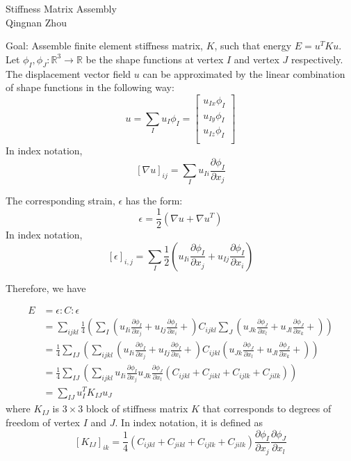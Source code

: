 \documentclass[12pt,letter]{article}
\renewcommand{\Re}{\ensuremath{\mathbb{R}}}
\begin{document}
\begin{center}
Stiffness Matrix Assembly\\
Qingnan Zhou
\end{center}
\vspace{0.2in}
Goal: Assemble finite element stiffness matrix, $K$, such that energy $E = u^T K u$.\\

Let $\phi_I, \phi_J : \Re^3 \rightarrow \Re$ be the shape functions at vertex
$I$ and vertex $J$ respectively.  The displacement vector field $u$ can be
approximated by the linear combination of shape functions in the following way:
$$
u = \sum_{I} u_I \phi_I = \left[
\begin{array}{c}
u_{Ix} \phi_I \\
u_{Iy} \phi_I \\
u_{Iz} \phi_I \\
\end{array}
\right]
$$
In index notation,
$$
[\nabla u]_{ij} = \sum_{I} u_{Ii} \frac{\partial \phi_I}{\partial x_j}
$$

The corresponding strain, $\epsilon$ has the form:
$$
\epsilon = \frac{1}{2} (\nabla u + \nabla u^T)
$$
In index notation,
$$
[\epsilon]_{i,j} = \sum_{I} \frac{1}{2} \left(u_{Ii} \frac{\partial \phi_I}{\partial x_j} +
u_{Ij} \frac{\partial \phi_I}{\partial x_i}\right)
$$

Therefore, we have

\begin{align*}
E &= \epsilon : C : \epsilon \\
  &= \sum_{ijkl} \frac{1}{4} \left( \sum_{I} \left(
  u_{Ii} \frac{\partial \phi_I}{\partial x_j} +
  u_{Ij} \frac{\partial \phi_I}{\partial x_i} +
  \right)
  C_{ijkl}
  \sum_{J} \left(
  u_{Jk} \frac{\partial \phi_J}{\partial x_l} +
  u_{Jl} \frac{\partial \phi_J}{\partial x_k} +
  \right)
  \right)\\
  &= \frac{1}{4} \sum_{IJ} \left( \sum_{ijkl} \left(
  u_{Ii} \frac{\partial \phi_I}{\partial x_j} +
  u_{Ij} \frac{\partial \phi_I}{\partial x_i} +
  \right)
  C_{ijkl}
  \left(
  u_{Jk} \frac{\partial \phi_J}{\partial x_l} +
  u_{Jl} \frac{\partial \phi_J}{\partial x_k} +
  \right)
  \right)\\
  &= \frac{1}{4} \sum_{IJ} \left( \sum_{ijkl}
  u_{Ii} \frac{\partial \phi_I}{\partial x_j}
  u_{Jk} \frac{\partial \phi_J}{\partial x_l}
  \left(
  C_{ijkl} + C_{jikl} + C_{ijlk} + C_{jilk}
  \right)
  \right)\\
  &= \sum_{IJ} u_I^T K_{IJ} u_J
\end{align*}
where $K_{IJ}$ is $3 \times 3$ block of stiffness matrix $K$ that corresponds to
degrees of freedom of vertex $I$ and $J$.  In index notation, it is defined as
$$
[K_{IJ}]_{ik} = \frac{1}{4}
( C_{ijkl} + C_{jikl} + C_{ijlk} + C_{jilk} )
\frac{\partial \phi_I}{\partial x_j} \frac{\partial \phi_J}{\partial x_l}
$$
\end{document}

